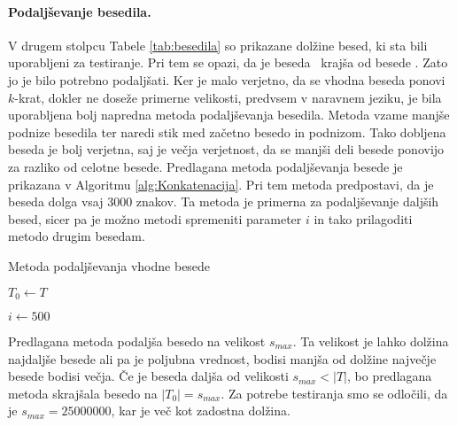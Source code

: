 \paragraph{Podaljševanje besedila.}

V drugem stolpcu Tabele \ref{tab:besedila} so prikazane dolžine besed, ki sta bili uporabljeni za testiranje. Pri tem se opazi, da je beseda \NK\ krajša od besede \DNK. Zato jo je bilo potrebno podaljšati. Ker je malo verjetno, da se vhodna beseda ponovi $k$-krat, dokler ne doseže primerne velikosti, predvsem v naravnem jeziku, je bila uporabljena bolj napredna metoda podaljševanja besedila. Metoda vzame manjše podnize besedila ter naredi stik med začetno besedo in podnizom. Tako dobljena beseda je bolj verjetna, saj je večja verjetnost, da se manjši deli besede ponovijo za razliko od celotne besede. Predlagana metoda podaljševanja besede je prikazana v Algoritmu \ref{alg:Konkatenacija}. Pri tem metoda predpostavi, da je beseda dolga vsaj $3000$ znakov. Ta metoda je primerna za podaljševanje daljših besed, sicer pa je možno metodi spremeniti parameter $i$ in tako prilagoditi metodo drugim besedam.


\begin{algorithm}[htb]

\caption{Metoda podaljševanja vhodne besede}\label{alg:Konkatenacija}
{
    {$T_0\leftarrow T$}

    {$i\leftarrow 500$}
    
    
}
\end{algorithm}

Predlagana metoda podaljša besedo na velikost $s_{max}$. Ta velikost je lahko dolžina najdaljše besede ali pa je poljubna vrednost, bodisi manjša od dolžine največje besede bodisi večja. Če je beseda daljša od velikosti $s_{max}<|T|$, bo predlagana metoda skrajšala besedo na $|T_0|=s_{max}$. Za potrebe testiranja smo se odločili, da je $s_{max}=25000000$, kar je več kot zadostna dolžina.

